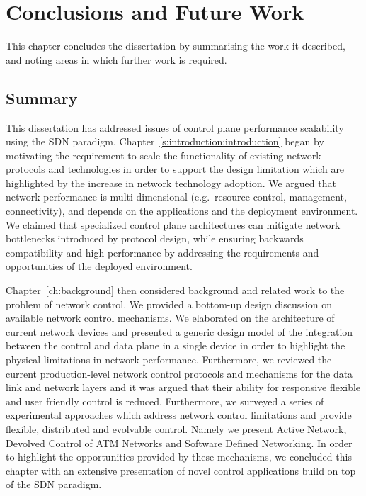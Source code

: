 \def\baselinestretch{1}
\chapter{Conclusions and Future Work} \label{sec:conclusions}

\def\baselinestretch{1.66}

This chapter concludes the dissertation by summarising the work it described,
and noting areas in which further work is required.

\section{Summary}

This dissertation has addressed issues of control plane performance scalability
using the SDN paradigm.  Chapter~\ref{s:introduction:introduction} began by
motivating the requirement to scale the functionality of existing network
protocols and technologies in order to support the design limitation which are
highlighted by the increase in network technology adoption.  We argued that
network performance is multi-dimensional (e.g.~resource control,
management, connectivity), and depends on the applications and the deployment
environment. We claimed that specialized control plane architectures can
mitigate network bottlenecks introduced by protocol design, while ensuring
backwards compatibility and high performance by addressing the requirements and
opportunities of the deployed environment. 

Chapter~\ref{ch:background} then considered background and related work to the
problem of network control. We provided a bottom-up design discussion on
available network control mechanisms. We elaborated on the architecture of
current network devices and presented a generic design model of the integration
between the control and data plane in a single device in order to highlight the
physical limitations in  network performance. Furthermore, we reviewed
the current production-level network control protocols and mechanisms for the
data link and network layers and it was argued that their ability for responsive
flexible and user friendly control is reduced. Furthermore, we surveyed a
series of experimental approaches which address network control limitations and
provide flexible, distributed and evolvable control.  Namely we present Active
Network, Devolved Control of ATM Networks and Software Defined Networking. In
order to highlight the opportunities provided by these mechanisms, we concluded
this chapter with an extensive presentation of novel control applications build
on top of the SDN paradigm. 

